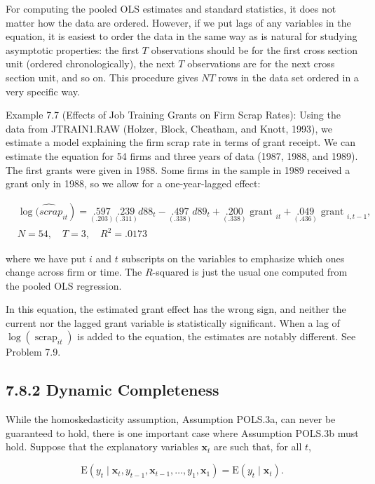 \documentclass[10pt]{article}
\begin{document}
For computing the pooled OLS estimates and standard statistics, it does not matter how the data are ordered. However, if we put lags of any variables in the equation, it is easiest to order the data in the same way as is natural for studying asymptotic properties: the first $T$ observations should be for the first cross section unit (ordered chronologically), the next $T$ observations are for the next cross section unit, and so on. This procedure gives $N T$ rows in the data set ordered in a very specific way.

Example 7.7 (Effects of Job Training Grants on Firm Scrap Rates): Using the data from JTRAIN1.RAW (Holzer, Block, Cheatham, and Knott, 1993), we estimate a model explaining the firm scrap rate in terms of grant receipt. We can estimate the equation for 54 firms and three years of data (1987, 1988, and 1989). The first grants were given in 1988. Some firms in the sample in 1989 received a grant only in 1988, so we allow for a one-year-lagged effect:

$$
\begin{aligned}
& \left.\log \widehat{(s c r a p}_{i t}\right)=\underset{(.203)}{.597} \underset{(.311)}{.239} d 88_{t}-\underset{(.338)}{.497} d 89_{t}+\underset{(.338)}{.200} \text { grant }_{i t}+\underset{(.436)}{.049} \text { grant }_{i, t-1}, \\
& N=54, \quad T=3, \quad R^{2}=.0173
\end{aligned}
$$

where we have put $i$ and $t$ subscripts on the variables to emphasize which ones change across firm or time. The $R$-squared is just the usual one computed from the pooled OLS regression.

In this equation, the estimated grant effect has the wrong sign, and neither the current nor the lagged grant variable is statistically significant. When a lag of $\log \left(\operatorname{scrap}_{i t}\right)$ is added to the equation, the estimates are notably different. See Problem 7.9.

\subsection*{7.8.2 Dynamic Completeness}
While the homoskedasticity assumption, Assumption POLS.3a, can never be guaranteed to hold, there is one important case where Assumption POLS.3b must hold. Suppose that the explanatory variables $\mathbf{x}_{t}$ are such that, for all $t$,


\begin{equation*}
\mathrm{E}\left(y_{t} \mid \mathbf{x}_{t}, y_{t-1}, \mathbf{x}_{t-1}, \ldots, y_{1}, \mathbf{x}_{1}\right)=\mathrm{E}\left(y_{t} \mid \mathbf{x}_{t}\right) . \tag{7.75}
\end{equation*}
\end{document}
